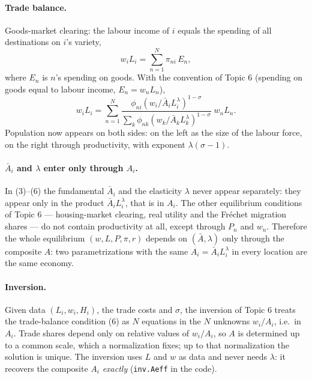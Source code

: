 \documentclass[11pt,a4paper]{article}
\begin{document}
\paragraph{Trade balance.} Goods-market clearing: the labour income of $i$ equals the spending of all destinations on $i$'s variety,
\begin{equation}
w_iL_i = \sum_{n=1}^{N}\pi_{ni}\,E_n,
\end{equation}
where $E_n$ is $n$'s spending on goods. With the convention of Topic 6 (spending on goods equal to labour income, $E_n = w_nL_n$),
\begin{equation}
w_iL_i = \sum_{n=1}^{N}
\frac{\phi_{ni}\left(w_i/\bar A_i L_i^{\lambda}\right)^{1-\sigma}}
     {\sum_{k}\phi_{nk}\left(w_k/\bar A_k L_k^{\lambda}\right)^{1-\sigma}}\;w_nL_n .
\end{equation}
Population now appears on both sides: on the left as the size of the labour force, on the right through productivity, with exponent $\lambda(\sigma-1)$.

\paragraph{$\bar A_i$ and $\lambda$ enter only through $A_i$.} In (3)--(6) the fundamental $\bar A_i$ and the elasticity $\lambda$ never appear separately: they appear only in the product $\bar A_iL_i^{\lambda}$, that is in $A_i$. The other equilibrium conditions of Topic 6 --- housing-market clearing, real utility and the Fréchet migration shares --- do not contain productivity at all, except through $P_n$ and $w_n$. Therefore the whole equilibrium $(w, L, P, \pi, r)$ depends on $(\bar A, \lambda)$ only through the composite $A$: two parametrizations with the same $A_i = \bar A_iL_i^{\lambda}$ in every location are the same economy.

\paragraph{Inversion.} Given data $(L_i, w_i, H_i)$, the trade costs and $\sigma$, the inversion of Topic 6 treats the trade-balance condition (6) as $N$ equations in the $N$ unknowns $w_i/A_i$, i.e.\ in $A_i$. Trade shares depend only on relative values of $w_i/A_i$, so $A$ is determined up to a common scale, which a normalization fixes; up to that normalization the solution is unique. The inversion uses $L$ and $w$ as data and never needs $\lambda$: it recovers the composite $A_i$ \emph{exactly} (\texttt{inv.Aeff} in the code).
\end{document}
